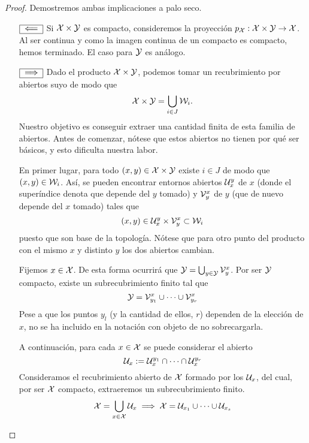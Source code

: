 \begin{proof}
	Demostremos ambas implicaciones a palo seco.
	\begin{itemize}[align=left, leftmargin=*]
		\item[$\fbox{$\impliedby$}$] Si $\mathcal{X}\times \mathcal{Y}$ es compacto, consideremos la proyección $p_{\mathcal{X}}: \mathcal{X}\times \mathcal{Y} \to \mathcal{X}$. Al ser continua y como la imagen continua de un compacto es compacto, hemos terminado. El caso para $\mathcal{Y}$ es análogo. 
		\item[$\fbox{$\implies$}$] Dado el producto $\mathcal{X}\times \mathcal{Y}$, podemos tomar un recubrimiento por abiertos suyo de modo que 
		\[\mathcal{X}\times \mathcal{Y}=\bigcup_{i\in J}\mathcal{W}_i.\]
		Nuestro objetivo es conseguir extraer una cantidad finita de esta familia de abiertos. Antes de comenzar, nótese que estos abiertos no tienen por qué ser básicos, y esto dificulta nuestra labor.
		
		En primer lugar, para todo $(x,y)\in\mathcal{X}\times \mathcal{Y}$ existe $i\in J$ de modo que $(x,y)\in \mathcal{W}_i$. Así, se pueden encontrar entornos abiertos $\mathcal{U}^y_x$ de $x$ (donde el superíndice denota que depende del $y$ tomado) y $\mathcal{V}_y^x$ de $y$ (que de nuevo depende del $x$ tomado) tales que
		\begin{equation*}
		(x,y)\in \mathcal{U}^y_x\times \mathcal{V}_y^x \subset \mathcal{W}_i
		\end{equation*}
		puesto que son base de la topología. Nótese que para otro punto del producto con el mismo $x$ y distinto $y$ los dos abiertos cambian.
		
		Fijemos $x\in \mathcal{X}$. De esta forma ocurrirá que $\mathcal{Y}=\bigcup_{y\in \mathcal{Y}} \mathcal{V}_y^x$. Por ser $\mathcal{Y}$ compacto, existe un subrecubrimiento finito tal que 
		\begin{equation*}
		\mathcal{Y}=\mathcal{V}^x_{y_1}\cup \dots \cup \mathcal{V}^x_{y_r}
		\end{equation*}
		Pese a que los puntos $y_l$ (y la cantidad de ellos, $r$) dependen de la elección de $x$, no se ha incluido en la notación con objeto de no sobrecargarla. 
		
		A continuación, para cada $x\in \mathcal{X}$ se puede considerar el abierto
		\begin{equation*}
		\mathcal{U}_x:=\mathcal{U}_x^{y_1}\cap \dots \cap \mathcal{U}_x^{y_r}
		\end{equation*}
		Consideramos el recubrimiento abierto de $\mathcal{X}$ formado por los $\mathcal{U}_x$, del cual, por ser $\mathcal{X}$ compacto, extraeremos un subrecubrimiento finito.
		\begin{equation*}
		\mathcal{X}=\bigcup_{x\in \mathcal{X}}\mathcal{U}_x\implies \mathcal{X}=\mathcal{U}_{x_1}\cup \dots \cup \mathcal{U}_{x_s}
		\end{equation*}
		

\end{itemize}
\end{proof}
